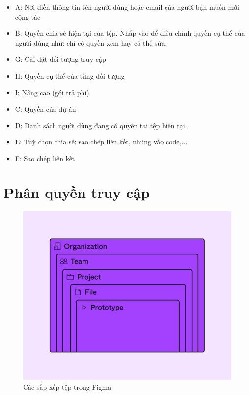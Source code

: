 \documentclass[11pt]{article}
\begin{document}
\begin{itemize}
          \begin{itemize}
              \item A: Nơi điền thông tin tên người dùng hoặc email của người bạn muốn mời cộng tác
              \item B: Quyền chia sẻ hiện tại của tệp. Nhấp vào để điều chỉnh quyền cụ thể của người dùng như: chỉ có quyền xem hay có thể sửa.
              \item G: Cài đặt đối tượng truy cập
              \item H: Quyền cụ thể của từng đối tượng
              \item I: Nâng cao (gói trả phí)
              \item C: Quyền của dự án
              \item D: Danh sách người dùng đang có quyền tại tệp hiện tại.
              \item E: Tuỳ chọn chia sẻ: sao chép liên kết, nhúng vào code,...
              \item F: Sao chép liên kết
          \end{itemize}


\end{itemize}
\newpage
\section{Phân quyền truy cập}

\begin{figure}[!h]
    \centering
    \includegraphics[width=1\linewidth]{imgs/3.png}
    \caption{Các sắp xếp tệp trong Figma}
\end{figure}
\end{document}
